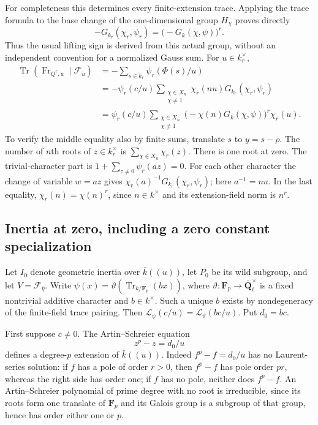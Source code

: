 For completeness this determines every finite-extension trace.
Applying the trace formula to the base change of the
one-dimensional group \(H_\chi\) proves directly
\[
 -G_{k_r}(\chi_r,\psi_r)
       =\bigl(-G_k(\chi,\psi)\bigr)^r.
 \tag{SPF.20}\label{CFStage:eq:SPF20}
\]
Thus the usual lifting sign is derived from this actual group,
without an independent convention for a normalized Gauss sum.
For \(u\in k_r^\times\),
\[
 \begin{split}
 \operatorname{Tr}(\operatorname{Fr}_{Q^r,u}\mid\mathcal F_{\bar u})
  &=-\sum_{s\in k_r}\psi_r(\Phi(s)/u)\\
  &=-\psi_r(c/u)
       \sum_{\substack{\chi\in X_n\\\chi\ne1}}
           \chi_r(nu)G_{k_r}(\chi_r,\psi_r)\\
  &=\psi_r(c/u)
       \sum_{\substack{\chi\in X_n\\\chi\ne1}}
          \bigl(-\chi(n)G_k(\chi,\psi)\bigr)^r\chi_r(u).
 \end{split}
 \tag{SPF.21}\label{CFStage:eq:SPF21}
\]
To verify the middle equality also by finite sums, translate
\(s\) to \(y=s-\rho\). The number of \(n\)th roots of
\(z\in k_r^\times\) is \(\sum_{\chi\in X_n}\chi_r(z)\).
There is one root at zero. The trivial-character part is
\(1+\sum_{z\ne0}\psi_r(az)=0\).
For each other character the change of variable \(w=az\)
gives \(\chi_r(a)^{-1}G_{k_r}(\chi_r,\psi_r)\);
here \(a^{-1}=nu\). In the last equality,
\(\chi_r(n)=\chi(n)^r\), since \(n\in k^\times\) and its
extension-field norm is \(n^r\).

\subsection{Inertia at zero, including a zero constant specialization}

Let \(I_0\) denote geometric inertia over
\(\bar k((u))\), let \(P_0\) be its wild subgroup, and let
\(V=\mathcal F_{\bar\eta}\).
Write \(\psi(x)=
\vartheta(\operatorname{Tr}_{k/\mathbf F_p}(b x))\), where
\(\vartheta:\mathbf F_p\to\overline{\mathbf Q}_\ell^\times\)
is a fixed nontrivial additive character and \(b\in k^\times\).
Such a unique \(b\) exists by nondegeneracy of the finite-field
trace pairing. Then
\(\mathcal L_\psi(c/u)=\mathcal L_\vartheta(bc/u)\).
Put \(d_0=bc\).

First suppose \(c\ne0\). The Artin--Schreier equation
\[
 z^p-z=d_0/u
 \tag{SPF.22}\label{CFStage:eq:SPF22}
\]
defines a degree-\(p\) extension of \(\bar k((u))\).
Indeed \(f^p-f=d_0/u\) has no Laurent-series solution:
if \(f\) has a pole of order \(r>0\), then \(f^p-f\)
has pole order \(pr\), whereas the right side has order one;
if \(f\) has no pole, neither does \(f^p-f\).
An Artin--Schreier polynomial of prime degree with no root
is irreducible, since its roots form one translate of
\(\mathbf F_p\) and its Galois group is a subgroup of that
group, hence has order either one or \(p\).

